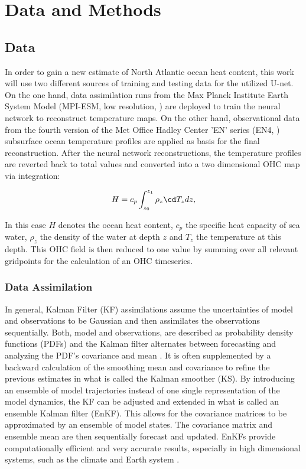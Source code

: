 \documentclass[Masterarbeit.tex]{subfile}
\begin{document}
	
	\chapter{Data and Methods}
	
	\section{Data}
	
	In order to gain a new estimate of North Atlantic ocean heat content, this work will use two different sources of training and testing data for the utilized U-net. On the one hand, data assimilation runs from the Max Planck Institute Earth System Model (MPI-ESM, low resolution, \cite{mauritsen_developments_2019}) are deployed to train the neural network to reconstruct temperature maps. On the other hand, observational data from the fourth version of the Met Office Hadley Center 'EN' series (EN4, \cite{good_en4_2013}) subsurface ocean temperature profiles are applied as basis for the final reconstruction. After the neural network reconstructions, the temperature profiles are reverted back to total values and converted into a two dimensional OHC map via integration:
	
	
	\begin{align}
	H = c_{p} \int_{z_0}^{z_1} \rho_z \cd T_z dz ,
	\end{align}
	
	In this case $H$ denotes the ocean heat content, $c_{p}$ the specific heat capacity of sea water, $\rho_z$ the density of the water at depth $z$ and $T_z$ the temperature at this depth. This OHC field is then reduced to one value by summing over all relevant gridpoints for the calculation of an OHC timeseries.	
	
	
	\subsection{Data Assimilation}
	
	In general, Kalman Filter (KF) assimilations assume the uncertainties of model and observations to be Gaussian and then assimilates the observations sequentially. Both, model and observations, are described as probability density functions (PDFs) and the Kalman filter alternates between forecasting and analyzing the PDF's covariance and mean \cite{carrassi_data_2018}. It is often supplemented by a backward calculation of the smoothing mean and covariance to refine the previous estimates in what is called the Kalman smoother (KS). By introducing an ensemble of model trajectories instead of one single representation of the model dynamics, the KF can be adjusted and extended in what is called an ensemble Kalman filter (EnKF). This allows for the covariance matrices to be approximated by an ensemble of model states. The covariance matrix and ensemble mean are then sequentially forecast and updated. EnKFs provide computationally efficient and very accurate results, especially in high dimensional systems, such as the climate and Earth system \citep{carrassi_data_2018}. \\
	
\end{document}
